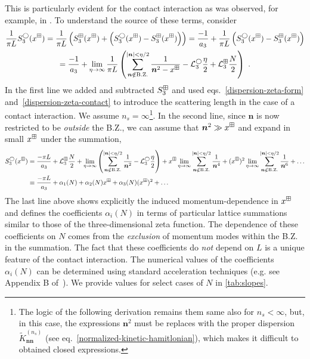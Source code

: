 This is particularly evident for the contact interaction as was observed, for example, in \cite{Endres:2012cw}.
To understand the source of these terms, consider
\begin{multline}
\frac{1}{\pi L}S^\bigcirc_3(x^\dispersion)=\frac{1}{\pi L}\left(S^{\dispersion}_3(x^\dispersion)+\left(S^\bigcirc_3(x^\dispersion)-S^{\dispersion}_3(x^\dispersion)\right)\right)=\frac{-1}{a_3}+\frac{1}{\pi L}\left(S^\bigcirc_3(x^\dispersion)-S^{\dispersion}_3(x^\dispersion)\right)\\
=\frac{-1}{a_3}+\lim_{\eta \to\infty}\frac{1}{\pi L}\left(\sum_{\bm n\notin \mathrm{B.Z.}}^{|\bm n|<\eta / 2} \frac{1}{\bm n^{2}-x^\dispersion}-\mathcal{L}^\bigcirc_3\frac{\eta}{2}+\mathcal{L}^\dispersion_3\frac{N}{2}\right)\ .
\end{multline}
In the first line we added and subtracted $S^\boxplus_3$ and used eqs.~\eqref{dispersion-zeta-form} and~\eqref{dispersion-zeta-contact} to introduce the scattering length in the case of a contact interaction.
We assume $n_s=\infty$\footnote{
The logic of the following derivation remains them same also for $n_s < \infty$, but, in this case, the expressions $\bm n^2$ must be replaces with the proper dispersion $\tilde K^{(n_s)}_{\bm n \bm n}$ (see eq.~\eqref{normalized-kinetic-hamitlonian}), which makes it difficult to obtained closed expressions.}.
In the second line, since $\bm n$ is now restricted to be \emph{outside} the B.Z., we can assume that $\bm n^2\gg x^\boxplus$ and expand in small $x^\boxplus$ under the summation,
\begin{align}
	\label{eqn:observable}
	S^\bigcirc_3(x^\boxplus)
	&=
	\frac{-\pi L}{a_3}
	+\mathcal{L}^\boxplus_3\frac{N}{2}
	+\lim_{\eta \to\infty}\left(\sum_{\bm n\notin \mathrm{B.Z.}}^{|\bm n|<\eta / 2} \frac{1}{\bm n^{2}}
	-\mathcal{L}^\bigcirc_3\frac{\eta}{2}\right)
	+x^\boxplus\lim_{\eta \to\infty}\sum_{\bm n\notin \mathrm{B.Z.}}^{|\bm n|<\eta / 2} \frac{1}{\bm n^{4}}
	+(x^\boxplus)^2\lim_{\eta \to\infty}\sum_{\bm n\notin \mathrm{B.Z.}}^{|\bm n|<\eta / 2} \frac{1}{\bm n^{6}}
	+ \ldots
	\\
	\label{eq:small x}
	&\equiv \frac{-\pi L}{a_3}+\alpha_1(N)+\alpha_2(N)x^\boxplus+\alpha_3(N)(x^\boxplus)^2
	+\ldots
\end{align}
The last line above shows explicitly the induced momentum-dependence in $x^\boxplus$ and defines the coefficients $\alpha_i(N)$ in terms of particular lattice summations similar to those of the three-dimensional zeta function.  The dependence of these coefficients on $N$ comes from the \emph{exclusion} of momentum modes within the B.Z. in the summation.   The fact that these coefficients do \emph{not} depend on $L$ is a unique feature of the contact interaction.  The numerical values of the coefficients $\alpha_i(N)$ can be determined using standard acceleration techniques (e.g. see Appendix B of~\cite{Luu:2011ep}).  We provide values for select cases of $N$ in \autoref{tab:slopes}.
